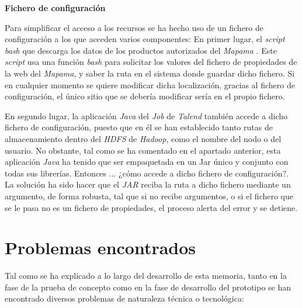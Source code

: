 \bigskip

\par 
\textbf{Fichero de configuración}
\par
Para simplificar el acceso a los recursos se ha hecho uso de un fichero de configuración a los que acceden varios componentes: En primer lugar, el \textit{script bash} que descarga los datos de los productos autorizados del \textit{Mapama} \cite{mapama}. Este \textit{script} usa una función \textit{bash} para solicitar los valores del fichero de propiedades de la web del \textit{Mapama}, y saber la ruta en el sistema donde guardar dicho fichero. Si en cualquier momento se quiere modificar dicha localización, gracias al fichero de configuración, el único sitio que se debería modificar sería en el propio fichero. 
\par En segundo lugar, la aplicación \textit{Java} del \textit{Job} de \textit{Talend} también accede a dicho fichero de configuración, puesto que en él se han establecido tanto rutas de almacenamiento dentro del \textit{HDFS} de \textit{Hadoop}, como el nombre del nodo o del usuario. No obstante, tal como se ha comentado en el apartado anterior, esta aplicación \textit{Java} ha tenido que ser empaquetada en un Jar único y conjunto con todas sus librerías. Entonces ... ¿cómo accede a dicho fichero de configuración?. La solución ha sido hacer que el \textit{JAR} reciba la ruta a dicho fichero mediante un argumento, de forma robusta, tal que si no recibe argumentos, o si el fichero que se le pasa no es un fichero de propiedades, el proceso alerta del error y se detiene. 
\bigskip


\section{Problemas encontrados} \label{implementacion.problemas}
\par
Tal como se ha explicado a lo largo del desarrollo de esta memoria, tanto en la fase de la prueba de concepto como en la fase de desarrollo del prototipo se han encontrado diversos problemas de naturaleza técnica o tecnológica:

